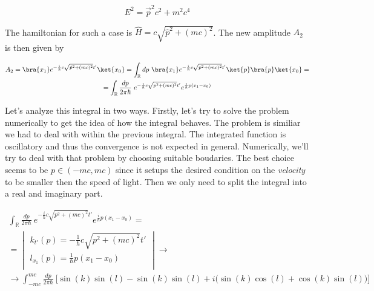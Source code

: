 \begin{equation}
    \label{eq:relativistic_energy}
    E^{2} = \vec{p}^{2} c^{2} + m^{2} c^{4}
\end{equation}

The hamiltonian for such a case is $\hat{H} = c\sqrt{\hat{p}^{2} + (mc)^{2}}$. The new amplitude $A_{2}$ is then given by

\begin{equation*}
    \begin{gathered}
        A_{2} = \bra{x_{1}} e^{- \frac{i}{\hbar} c\sqrt{\hat{p}^{2} + (mc)^{2}} t'}\ket{x_{0}} = \int_{\mathbb{R}} dp \ \bra{x_{1}} e^{- \frac{i}{\hbar} c \sqrt{p^{2} + (mc)^{2}} t'} \ket{p} \bra{p} \ket{x_{0}} = \\
        = \int_{\mathbb{R}} \frac{dp}{2 \pi \hbar} \ e^{- \frac{i}{\hbar} c \sqrt{p^{2} + (mc)^{2}} t'} e^{\frac{i}{\hbar}p (x_{1} - x_{0})}
    \end{gathered}
\end{equation*}

Let's analyze this integral in two ways. Firstly, let's try to solve the problem numerically to get the idea of how the integral behaves.
The problem is similiar we had to deal with within the previous integral. The integrated function is oscillatory and thus the convergence
is not expected in general. Numerically, we'll try to deal with that problem by choosing suitable boudaries. The best choice seems to be
$p \in (-mc, mc)$ since it setups the desired condition on the \textit{velocity} to be smaller then the speed of light. Then we only need 
to split the integral into a real and imaginary part.

\begin{equation*}
    \begin{gathered}
        \int_{\mathbb{R}} \frac{dp}{2 \pi \hbar} \ e^{- \frac{i}{\hbar} c \sqrt{p^{2} + (mc)^{2}} t'} e^{\frac{i}{\hbar}p (x_{1} - x_{0})} = \\
        = \begin{vmatrix}
            k_{t'}(p) = - \frac{1}{\hbar} c \sqrt{p^{2} + (mc)^{2}} t' \\
            l_{x_{1}}(p) = \frac{1}{\hbar}p (x_{1} - x_{0}) \\
        \end{vmatrix} \to \\
        \to \int_{-mc}^{mc} \frac{dp}{2 \pi \hbar} \ \bigg[ \sin(k) \sin(l) - \sin(k) \sin(l) + i\big(\sin(k) \cos(l) + \cos(k) \sin(l)\big) \bigg]
    \end{gathered}
\end{equation*}

